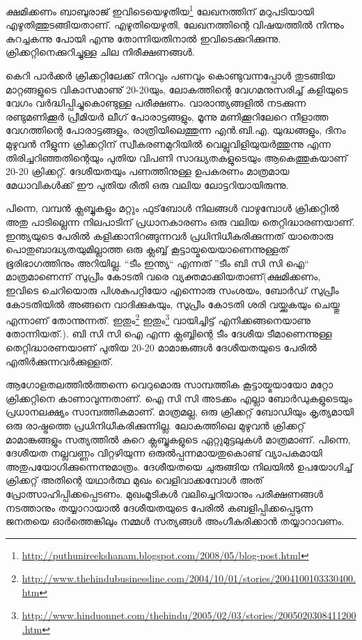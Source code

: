\vskip 2pt

ക്ഷമിക്കണം ബാബുരാജ് ഇവിടെയെഴുതിയ\footnote{\url{http://puthunireekshanam.blogspot.com/2008/05/blog-post.html}} 
ലേഖനത്തിന് മറുപടിയായി എഴുതിത്തുടങ്ങിയതാണ്. എഴുതിയെഴുതി, ലേഖനത്തിന്റെ വിഷയത്തില്‍ നിന്നും കുറച്ചകന്നു 
പോയി എന്നു തോന്നിയതിനാല്‍ ഇവിടെക്കുറിക്കുന്നു. ക്രിക്കറ്റിനെക്കുറിച്ചുള്ള ചില നിരീക്ഷണങ്ങള്‍.

കെറി പാര്‍ക്കര്‍ ക്രിക്കറ്റിലേക്ക് നിറവും പണവും കൊണ്ടുവന്നപ്പോള്‍ തുടങ്ങിയ മാറ്റങ്ങളുടെ വികാസമാണു് 20-20യും, 
ലോകത്തിന്റെ വേഗമനുസരിച്ച് കളിയുടെ വേഗം വര്‍ദ്ധിപ്പിച്ചുകൊണ്ടുള്ള പരീക്ഷണം. വാരാന്ത്യങ്ങളില്‍ നടക്കുന്ന 
രണ്ടുമണിക്കൂര്‍ പ്രീമിയര്‍ ലീഗ് പോരാട്ടങ്ങളും, മൂന്നു മണിക്കൂറിലേറെ നീളാത്ത വേഗത്തിന്റെ പോരാട്ടങ്ങളും, 
രാത്രിയിലെത്തുന്ന എന്‍.ബി.എ. യുദ്ധങ്ങളും, ദിനം മുഴുവന്‍ നീളുന്ന ക്രിക്കറ്റിന് സ്വീകരണമുറിയില്‍ വെല്ലുവിളിയുയര്‍ത്തുന്നു 
എന്ന തിരിച്ചറിഞ്ഞതിന്റെയും പുതിയ വിപണി സാദ്ധ്യതകളുടെയും ആകെത്തുകയാണ് 20-20 ക്രിക്കറ്റ്. 
ദേശീയതയും പണത്തിനുള്ള ഉപകരണം മാത്രമായ മേധാവികള്‍ക്ക് ഈ പുതിയ രീതി ഒരു വലിയ ലോട്ടറിയായിരുന്നു.

പിന്നെ, വമ്പന്‍ ക്ലബ്ബുകളും മറ്റും ഫുട്‌ബോള്‍ നിലങ്ങള്‍ വാഴുമ്പോള്‍ ക്രിക്കറ്റില്‍ അതു പാടില്ലെന്ന നിലപാടിന് 
പ്രധാനകാരണം ഒരു വലിയ തെറ്റിദ്ധാരണയാണ്. ഇന്ത്യയുടെ പേരില്‍ കളിക്കാനിറങ്ങുന്നവര്‍ പ്രധിനിധീകരിക്കുന്നത് 
യാതൊരു പൊതുബാദ്ധ്യതയുമില്ലാത്ത ഒരു ക്ലബ്ബ് കൂട്ടായ്മയെയാണെന്നുള്ളത് ഭൂരിഭാഗത്തിനും അറിയില്ല. ``ടീം ഇന്ത്യ`` എന്നത് ''ടീം ബി സി സി ഐ`` 
മാത്രമാണെന്ന് സുപ്രീം കോടതി വരെ വ്യക്തമാക്കിയതാണ്(ക്ഷമിക്കണം, ഇവിടെ ചെറിയൊരു പിശകുപറ്റിയോ എന്നൊരു സംശയം, 
ബോര്‍ഡ് സുപ്രീം കോടതിയില്‍ അങ്ങനെ വാദിക്കുകയും, സുപ്രീം കോടതി ശരി വയ്ക്കുകയും ചെയ്തു എന്നാണ് തോന്നുന്നത്. 
ഇതും\footnote{\url{http://www.thehindubusinessline.com/2004/10/01/stories/2004100103330400.htm}} 
ഇതും\footnote{\url{http://www.hinduonnet.com/thehindu/2005/02/03/stories/2005020308411200.htm}} 
വായിച്ചിട്ട് എനിക്കങ്ങനെയാണു തോന്നിയത്.). ബി സി സി ഐ എന്ന ക്ലബ്ബിന്റെ ടീം ദേശീയ ടീമാണെന്നുള്ള 
തെറ്റിദ്ധാരണയാണ് പുതിയ 20-20 മാമാങ്കങ്ങള്‍ ദേശീയതയുടെ പേരില്‍ എതിര്‍ക്കുന്നവര്‍ക്കുള്ളത്.

ആഗോളതലത്തില്‍ത്തന്നെ വെറുമൊരു സാമ്പത്തിക കൂട്ടായ്മയായോ മറ്റോ ക്രിക്കറ്റിനെ കാണാവുന്നതാണ്. 
ഐ സി സി അടക്കം എല്ലാ ബോര്‍ഡുകളുടെയും പ്രധാനലക്ഷ്യം സാമ്പത്തികമാണ്. മാത്രമല്ല, ഒരു ക്രിക്കറ്റ് ബോഡിയും 
കൃത്യമായി ഒരു രാഷ്ട്രത്തെ പ്രധിനിധീകരിക്കുന്നില്ല. ലോകത്തിലെ മുഴുവന്‍ ക്രിക്കറ്റ് മാമാങ്കങ്ങളും സത്യത്തില്‍ കുറെ 
ക്ലബ്ബുകളുടെ ഏറ്റുമുട്ടലുകള്‍ മാത്രമാണ്. പിന്നെ, ദേശീയത നല്ലവണ്ണം വിറ്റഴിയുന്ന ഒരുല്‍പ്പന്നമായതുകൊണ്ട് വ്യാപകമായി 
അതുപയോഗിക്കുന്നെന്നുമാത്രം. ദേശീയതയെ ചുരുങ്ങിയ നിലയില്‍ ഉപയോഗിച്ച് ക്രിക്കറ്റ് അതിന്റെ യഥാര്‍ത്ഥ മുഖം 
വെളിവാക്കമ്പോള്‍ അത് പ്രോത്സാഹിപ്പിക്കപ്പെടണം. മുഖംമൂടികള്‍ വലിച്ചെറിയാനും പരീക്ഷണങ്ങള്‍ നടത്താനും 
തയ്യാറായാല്‍ ദേശീയതയുടെ പേരില്‍ കബളിപ്പിക്കപ്പെടുന്ന ജനതയെ ഓര്‍ത്തെങ്കിലും നമ്മള്‍ സത്യങ്ങള്‍ അംഗീകരിക്കാന്‍ 
തയ്യാറാവണം.

